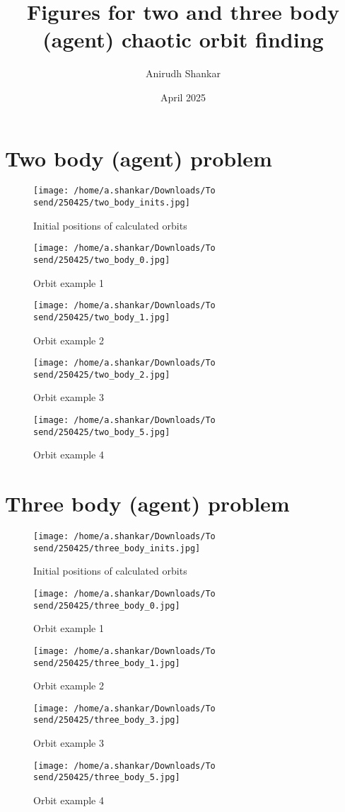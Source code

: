 \documentclass{article}
\title{Figures for two and three body (agent) chaotic orbit finding}
\author{Anirudh Shankar}
\date{April 2025}
\begin{document}
\maketitle

\section{Two body (agent) problem}
\begin{figure}
    \centering
    \texttt{[image: /home/a.shankar/Downloads/To send/250425/two\_body\_inits.jpg]}
    \caption{Initial positions of calculated orbits}
\end{figure}
\clearpage
\begin{figure}
    \centering
    \texttt{[image: /home/a.shankar/Downloads/To send/250425/two\_body\_0.jpg]}
    \caption{Orbit example 1}
\end{figure}
\clearpage
\begin{figure}
    \centering
    \texttt{[image: /home/a.shankar/Downloads/To send/250425/two\_body\_1.jpg]}
    \caption{Orbit example 2}
\end{figure}
\clearpage
\begin{figure}
    \centering
    \texttt{[image: /home/a.shankar/Downloads/To send/250425/two\_body\_2.jpg]}
    \caption{Orbit example 3}
\end{figure}
\clearpage
\begin{figure}
    \centering
    \texttt{[image: /home/a.shankar/Downloads/To send/250425/two\_body\_5.jpg]}
    \caption{Orbit example 4}
\end{figure}
\clearpage
\section{Three body (agent) problem}
\begin{figure}
    \centering
    \texttt{[image: /home/a.shankar/Downloads/To send/250425/three\_body\_inits.jpg]}
    \caption{Initial positions of calculated orbits}
\end{figure}
\clearpage
\begin{figure}
    \centering
    \texttt{[image: /home/a.shankar/Downloads/To send/250425/three\_body\_0.jpg]}
    \caption{Orbit example 1}
\end{figure}
\clearpage
\begin{figure}
    \centering
    \texttt{[image: /home/a.shankar/Downloads/To send/250425/three\_body\_1.jpg]}
    \caption{Orbit example 2}
\end{figure}
\clearpage
\begin{figure}
    \centering
    \texttt{[image: /home/a.shankar/Downloads/To send/250425/three\_body\_3.jpg]}
    \caption{Orbit example 3}
\end{figure}
\clearpage
\begin{figure}
    \centering
    \texttt{[image: /home/a.shankar/Downloads/To send/250425/three\_body\_5.jpg]}
    \caption{Orbit example 4}
\end{figure}
\end{document}
